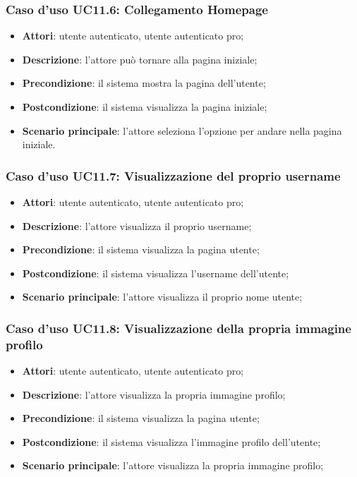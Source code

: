 \subsubsection{Caso d'uso UC11.6: Collegamento Homepage}
\begin{itemize}
\item\textbf{Attori}: utente autenticato, utente autenticato pro;
\item\textbf{Descrizione}: l'attore può tornare alla pagina iniziale;
\item\textbf{Precondizione}: il sistema mostra la pagina dell'utente;
\item\textbf{Postcondizione}: il sistema visualizza la pagina iniziale;
\item\textbf{Scenario principale}: l'attore seleziona l'opzione per andare nella pagina iniziale.
\end{itemize}

\subsubsection{Caso d'uso UC11.7: Visualizzazione del proprio username}
\begin{itemize}
	\item\textbf{Attori}: utente autenticato, utente autenticato pro;
	\item\textbf{Descrizione}: l'attore visualizza il proprio username;
	\item\textbf{Precondizione}: il sistema visualizza la pagina utente;
	\item\textbf{Postcondizione}: il sistema visualizza l'username dell'utente;
	\item\textbf{Scenario principale}: l'attore visualizza il proprio nome utente;
\end{itemize}

\subsubsection{Caso d'uso UC11.8: Visualizzazione della propria immagine profilo }
\begin{itemize}
	\item\textbf{Attori}: utente autenticato, utente autenticato pro;
	\item\textbf{Descrizione}: l'attore visualizza la propria immagine profilo;
	\item\textbf{Precondizione}: il sistema visualizza la pagina utente;
	\item\textbf{Postcondizione}: il sistema visualizza l'immagine profilo dell'utente;
	\item\textbf{Scenario principale}: l'attore visualizza la propria immagine profilo;
\end{itemize}

